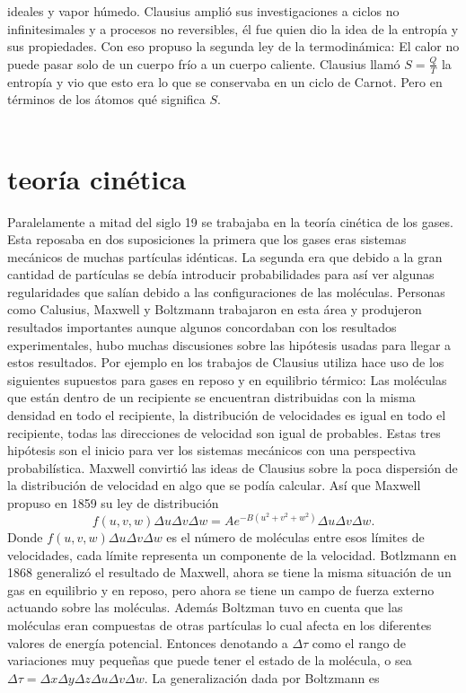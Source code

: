 ideales y vapor húmedo. Clausius amplió sus investigaciones a ciclos no infinitesimales y a procesos no reversibles, él fue quien dio la idea de la entropía y sus propiedades. Con eso propuso la segunda ley de la termodinámica: El calor no puede pasar solo de un cuerpo frío a un cuerpo caliente. Clausius llamó $S=\frac{Q}{T}$ la entropía y vio que esto era lo que se conservaba en un ciclo de Carnot. Pero en términos de los átomos qué significa $S$.
\\\
\section{teoría cinética}
Paralelamente a mitad del siglo 19 se trabajaba en la teoría cinética de los gases. Esta reposaba en dos suposiciones la primera que los gases eras sistemas mecánicos de muchas partículas idénticas. La segunda era que debido a la gran cantidad de partículas se debía introducir probabilidades para así ver algunas regularidades que salían debido a las configuraciones de las moléculas. Personas como Calusius, Maxwell y Boltzmann trabajaron en esta área y produjeron resultados importantes aunque algunos concordaban con los resultados experimentales, hubo muchas discusiones sobre las hipótesis usadas para llegar a estos resultados. Por ejemplo en los trabajos de Clausius utiliza hace uso de los siguientes supuestos para gases en reposo y en equilibrio térmico: Las moléculas que están dentro de un recipiente se encuentran distribuidas con la misma densidad en todo el recipiente, la distribución de velocidades es igual en todo el recipiente, todas las direcciones de velocidad son igual de probables. Estas tres hipótesis son el inicio para ver los sistemas mecánicos con una perspectiva probabilística. Maxwell convirtió las ideas de Clausius sobre la  poca dispersión de la distribución de velocidad en algo que se podía calcular. Así que Maxwell propuso en 1859 su ley de distribución
\begin{equation}
f(u,v,w) \Delta u \Delta v \Delta w = A e^{-B(u^{2}+v^{2}+w^{2})}  \Delta u \Delta v \Delta w.
\end{equation}
Donde $f(u,v,w) \Delta u \Delta v \Delta w $ es el número de moléculas entre esos límites de velocidades, cada límite representa un componente de la velocidad. Botlzmann en 1868 generalizó el resultado de Maxwell, ahora se tiene la misma situación de un gas en equilibrio y en reposo, pero ahora se tiene un campo de fuerza externo actuando sobre las moléculas. Además Boltzman tuvo en cuenta que las moléculas eran compuestas de otras partículas  lo cual afecta en los diferentes valores de energía potencial. Entonces denotando a $\Delta \tau$ como el rango de variaciones muy pequeñas que puede tener el estado de la molécula, o sea $\Delta \tau= \Delta x \Delta y \Delta z \Delta u \Delta v \Delta w$. La generalización dada por Boltzmann es
